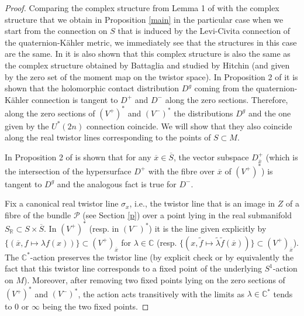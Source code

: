 \documentclass{amsart}
\begin{document}
\begin{proof}
   Comparing the complex structure from Lemma 1 of \cite{Bo} with the complex structure that we obtain in  Proposition  \ref{main} in the particular case when we start from the connection on $S$ that is induced by the Levi-Civita connection of the quaternion-K\"ahler metric, we immediately see that the structures in this case are the same.  In \cite{Bo} it is also shown that this complex structure is also the same as the complex structure obtained by Battaglia \cite{Bat} and studied by Hitchin \cite{Hit3} (and given by the zero set of the moment map on the twistor space). In Proposition 2 of \cite{Bo} it is shown that the holomorphic contact distribution $D^g$ coming from the quaternion-K\"ahler connection is tangent to $D^+$ and $D^-$ along the zero sections. Therefore, along the zero sections of $(V^+)^*$ and $(V^-)^*$ the distributions $D^g$ and the one given by the $U^*(2n)$ connection coincide. We will show that they also coincide along the real twistor lines corresponding to the points of $S\subset M$.  
   
   In Proposition 2 of \cite{Bo} is shown that for any $\overline{x}\in\overline{S}$, the vector subspace $D_{\overline{x}}^+$ (which is the intersection of the hypersurface $D^+$ with the fibre over $\overline{x}$ of $(V^+)^*$) is tangent to  $D^g$ and the analogous fact is true for $D^-$.

   Fix a canonical real twistor line $\sigma_x$, i.e., the twistor line that is an image in $Z$ of a fibre of the bundle $\mathcal{P}$ (see Section \ref{p}) over a point lying in the real submanifold $S_{\mathbb{R}}\subset S\times \overline{S}$. In $(V^+)^*$ (resp. in $(V^-)^*$) it is the line given explicitly by $\{(\overline{x},f\mapsto \lambda f(x))\}\subset (V^+)_{\overline{x}}$ for  $\lambda \in \mathbb{C}$ (resp. $\{(x,\tilde{f}\mapsto \tilde{\lambda} \tilde{f}(\overline{x}))\}\subset (V^+)_{\overline{x}}$). The $\mathbb{C}^*$-action preserves the twistor line (by explicit check or by equivalently the fact that this twistor line corresponds to a fixed point of the underlying $S^1$-action on $M$). Moreover, after removing two fixed points lying on the zero sections of  $(V^+)^*$ and $(V^-)^*$, the action acts transitively with the limits as $\lambda\in \mathbb{C}^*$ tends to $0$ or $\infty$ being the two fixed points.



\end{proof}
\end{document}
